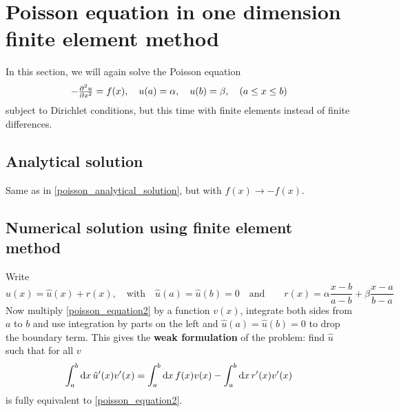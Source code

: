 \section{Poisson equation in one dimension finite element method}

\newcommand\basisexpand[2]{\sum_{i=0}^{M+1} #1_i \varphi_i(#2)}
\newcommand\integral[4]{\int_#3^#4 \dif #2 \, #1}

In this section, we will again solve the Poisson equation
\begin{equation}
	-\pd[2]{u}{x} = f(x), \quad u(a) = \alpha, \quad u(b) = \beta, \quad (a \leq x \leq b)
	\label{poisson_equation2}
\end{equation}
subject to Dirichlet conditions, but this time with finite elements instead of finite differences.

\subsection{Analytical solution}

Same as in \cref{poisson_analytical_solution}, but with $f(x) \rightarrow -f(x)$.

\subsection{Numerical solution using finite element method}

Write
\begin{equation}
	u(x) = \hat{u}(x) + r(x), \quad \text{with} \quad \hat{u}(a) = \hat{u}(b) = 0 \quad \text{and} \quad \quad r(x) = \alpha \frac{x-b}{a-b} + \beta \frac{x-a}{b-a}
\end{equation}
Now multiply \cref{poisson_equation2} by a function $v(x)$, integrate both sides from $a$ to $b$ and use integration by parts on the left and $\hat{u}(a) = \hat{u}(b) = 0$ to drop the boundary term.
This gives the \textbf{weak formulation} of the problem: find $\hat{u}$ such that for all $v$
\newcommand{\weakform}[3]{\integral{\hat{#1}'(x) #2'(x)}{x}{a}{b} = \integral{f(x) #2(x)}{x}{a}{b} - \integral{#3'(x) #2'(x)}{x}{a}{b}}
\begin{equation}
	\weakform{u}{v}{r}
	\label{weak_form_exact}
\end{equation}
 is fully equivalent to \cref{poisson_equation2}.

